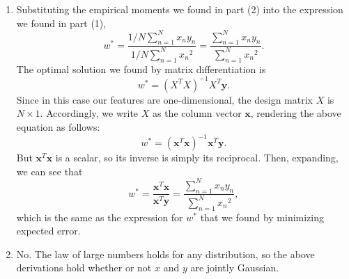 \documentclass[submit]{harvardml}
\begin{document}
\begin{enumerate}
    \item Substituting the empirical moments we found in part (2) into the expression we found in part (1),
    \begin{equation*}
        w^* = \frac{1/N \sum_{n=1}^N x_n y_n}{1/N \sum_{n=1}^N {x_n}^2} = \frac{\sum_{n=1}^N x_n y_n}{\sum_{n=1}^N {x_n}^2}.
    \end{equation*}
    The optimal solution we found by matrix differentiation is
    \begin{equation*}
        w^* = (X^T X)^{-1}X^T \mathbf{y}.
    \end{equation*}
    Since in this case our features are one-dimensional, the design matrix $X$ is $N \times 1$.  Accordingly, we write $X$ as the column vector $\mathbf{x}$, rendering the above equation as follows:
    \begin{equation*}
        w^* = (\mathbf{x}^T \mathbf{x})^{-1} \mathbf{x}^T \mathbf{y}.
    \end{equation*}
    But $\mathbf{x}^T \mathbf{x}$ is a scalar, so its inverse is simply its reciprocal.  Then, expanding, we can see that
    \begin{equation*}
        w^* = \frac{\mathbf{x}^T\mathbf{x}}{\mathbf{x}^T\mathbf{y}} = \frac{\sum_{n=1}^N x_n y_n}{\sum_{n=1}^N {x_n}^2},
    \end{equation*}
    which is the same as the expression for $w^*$ that we found by minimizing expected error.
    
    \item No.  The law of large numbers holds for any distribution, so the above derivations hold whether or not $x$ and $y$ are jointly Gaussian.
\end{enumerate}


\end{document}
